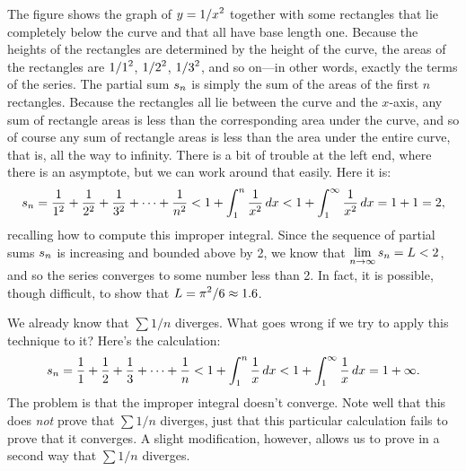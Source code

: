 \begin{example}
The figure shows the graph of $\displaystyle y=1/x^2$ together with some rectangles
that lie completely below the curve and that all have base length
one. Because the heights of the rectangles are determined by the
height of the curve, the areas of the rectangles are $\displaystyle 1/1^2$, $\displaystyle 1/2^2$,
$\displaystyle 1/3^2$, and so on---in other words, exactly the terms of the
series. The partial sum $\displaystyle s_n$ is simply the sum of the areas of the
first $n$ rectangles. Because the rectangles all lie between the curve
and the $x$-axis, any sum of rectangle areas is less than the
corresponding area under the curve, and so of course any sum of
rectangle areas is less than the area under the entire curve, that is,
all the way to infinity.
There is a bit of trouble at the
left end, where there is an asymptote, but we can work around that
easily. Here it is:
$$
  s_n={1\over 1^2}+{1\over 2^2}+{1\over 3^2}+\cdots+{1\over n^2}
  < 1 + \int_1^n {1\over x^2}\,dx < 1+\int_1^\infty {1\over x^2}\,dx 
  =1+1=2,
$$
recalling how to compute this improper integral. Since the sequence of partial
sums $\displaystyle s_n$ is increasing and bounded above by 2, we know that 
$\displaystyle\lim_{n\to\infty}s_n=L<2$, and so the series converges to some
number less than 2. In fact, it is possible, though difficult, to show
that $\displaystyle L=\pi^2/6\approx 1.6$.
\end{example}

We already know that $\sum 1/n$ diverges. What goes wrong if we try to
apply this technique to it? Here's the calculation:
$$
  s_n={1\over 1}+{1\over 2}+{1\over 3}+\cdots+{1\over n}
  < 1 + \int_1^n {1\over x}\,dx < 1+\int_1^\infty {1\over x}\,dx 
  =1+\infty.
$$
The problem is that the improper integral doesn't converge. Note well
that this does {\em not\/} prove that $\sum 1/n$ diverges, just that
this particular calculation fails to prove that it converges. A slight
modification, however, allows us to prove in a second way that $\sum
1/n$ diverges. 

